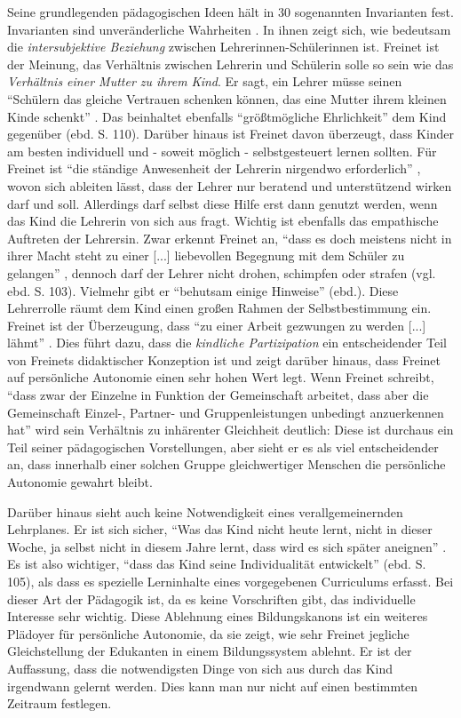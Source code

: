 Seine grundlegenden pädagogischen Ideen hält \citeauthor{Freinet-2000a} in 30 sogenannten Invarianten fest.
Invarianten sind unveränderliche Wahrheiten \citep[vgl.][S.~488]{Freinet-2000a}.
In ihnen zeigt sich, wie bedeutsam die \emph{intersubjektive Beziehung} zwischen Lehrerinnen-Schülerinnen ist.
Freinet ist der Meinung, das Verhältnis zwischen Lehrerin und Schülerin solle so sein wie das \emph{Verhältnis einer Mutter zu ihrem Kind}.
Er sagt, ein Lehrer müsse seinen ``Schülern das gleiche Vertrauen schenken können, das eine Mutter ihrem kleinen Kinde schenkt'' \citep[105]{Freinet1979}.
Das beinhaltet ebenfalls ``größtmögliche Ehrlichkeit'' dem Kind gegenüber (ebd. S. 110).
Darüber hinaus ist Freinet davon überzeugt, dass Kinder am besten individuell und - soweit möglich - selbstgesteuert lernen sollten.
Für Freinet ist ``die ständige Anwesenheit der Lehrerin nirgendwo erforderlich'' \citep[105]{Freinet1979}, wovon sich ableiten lässt, dass der Lehrer nur beratend und unterstützend wirken darf und soll.
Allerdings darf selbst diese Hilfe erst dann genutzt werden, wenn das Kind die Lehrerin von sich aus fragt.
Wichtig ist ebenfalls das empathische Auftreten der Lehrersin.
Zwar erkennt Freinet an, ``dass es doch meistens nicht in ihrer Macht steht zu einer [...] liebevollen Begegnung mit dem Schüler zu gelangen'' \citep[101]{Freinet1979}, dennoch darf der Lehrer nicht drohen, schimpfen oder strafen (vgl. ebd. S. 103).
Vielmehr gibt er ``behutsam einige Hinweise'' (ebd.).
Diese Lehrerrolle räumt dem Kind einen großen Rahmen der Selbstbestimmung ein.
Freinet ist der Überzeugung, dass ``zu einer Arbeit gezwungen zu werden [...] lähmt'' \citep[vgl.][S.~495]{Freinet-2000a}.
Dies führt dazu, dass die \emph{kindliche Partizipation} ein entscheidender Teil von Freinets didaktischer Konzeption ist und zeigt darüber hinaus, dass Freinet auf persönliche Autonomie einen sehr hohen Wert legt.
Wenn Freinet schreibt, ``dass zwar der Einzelne in Funktion der Gemeinschaft arbeitet, dass aber die Gemeinschaft Einzel-, Partner- und Gruppenleistungen unbedingt anzuerkennen hat'' \citep[87]{Freinet1979} wird sein Verhältnis zu inhärenter Gleichheit deutlich:
Diese ist durchaus ein Teil seiner pädagogischen Vorstellungen, aber sieht er es als viel entscheidender an, dass innerhalb einer solchen Gruppe gleichwertiger Menschen die persönliche Autonomie gewahrt bleibt.

Darüber hinaus sieht \citeauthor{Freinet1979} auch keine Notwendigkeit eines verallgemeinernden Lehrplanes.
Er ist sich sicher, ``Was das Kind nicht heute lernt, nicht in dieser Woche, ja selbst nicht in diesem Jahre lernt, dass wird es sich später aneignen'' \citep[~101]{Freinet1979}.
Es ist also wichtiger, ``dass das Kind seine Individualität entwickelt'' (ebd. S. 105), als dass es spezielle Lerninhalte eines vorgegebenen Curriculums erfasst.
Bei dieser Art der Pädagogik ist, da es keine Vorschriften gibt, das individuelle Interesse sehr wichtig.
Diese Ablehnung eines Bildungskanons ist ein weiteres Plädoyer für persönliche Autonomie, da sie zeigt, wie sehr Freinet jegliche Gleichstellung der Edukanten in einem Bildungssystem ablehnt.
Er ist der Auffassung, dass die notwendigsten Dinge von sich aus durch das Kind irgendwann gelernt werden.
Dies kann man nur nicht auf einen bestimmten Zeitraum festlegen.

